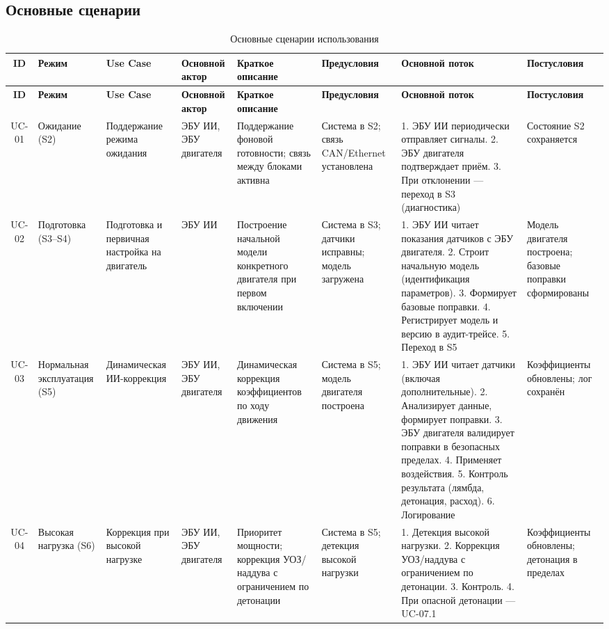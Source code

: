 \documentclass[14pt, a4paper]{extarticle}
\begin{document}
				\subsection{Основные сценарии}
					{\fontsize{9}{11}\selectfont
						\begin{xltabular}{\textwidth}{|c|L|L|L|L|L|L|L|}
						\caption{Основные сценарии использования}\label{tab:usecases-main}\\
						\hline
						\textbf{ID} & \textbf{Режим} & \textbf{Use Case} & \textbf{Основной актор} & \textbf{Краткое описание} & \textbf{Предусловия} & \textbf{Основной поток} & \textbf{Постусловия} \\
						\hline
						\endfirsthead
						\hline
						\textbf{ID} & \textbf{Режим} & \textbf{Use Case} & \textbf{Основной актор} & \textbf{Краткое описание} & \textbf{Предусловия} & \textbf{Основной поток} & \textbf{Постусловия} \\
						\hline
						\endhead
						\hline
						\endfoot
						\hline
						\endlastfoot
						UC-01 & Ожидание (S2) & Поддержание режима ожидания & ЭБУ ИИ, ЭБУ двигателя & Поддержание фоновой готовности; связь между блоками активна & Система в S2; связь CAN/Ethernet установлена & 1. ЭБУ ИИ периодически отправляет сигналы. 2. ЭБУ двигателя подтверждает приём. 3. При отклонении — переход в S3 (диагностика) & Состояние S2 сохраняется \\
						\hline
						UC-02 & Подготовка (S3–S4) & Подготовка и первичная настройка на двигатель & ЭБУ ИИ & Построение начальной модели конкретного двигателя при первом включении & Система в S3; датчики исправны; модель загружена & 1. ЭБУ ИИ читает показания датчиков с ЭБУ двигателя. 2. Строит начальную модель (идентификация параметров). 3. Формирует базовые поправки. 4. Регистрирует модель и версию в аудит-трейсе. 5. Переход в S5 & Модель двигателя построена; базовые поправки сформированы \\
						\hline
						UC-03 & Нормальная эксплуатация (S5) & Динамическая ИИ-коррекция & ЭБУ ИИ, ЭБУ двигателя & Динамическая коррекция коэффициентов по ходу движения & Система в S5; модель двигателя построена & 1. ЭБУ ИИ читает датчики (включая дополнительные). 2. Анализирует данные, формирует поправки. 3. ЭБУ двигателя валидирует поправки в безопасных пределах. 4. Применяет воздействия. 5. Контроль результата (лямбда, детонация, расход). 6. Логирование & Коэффициенты обновлены; лог сохранён \\
						\hline
						UC-04 & Высокая нагрузка (S6) & Коррекция при высокой нагрузке & ЭБУ ИИ, ЭБУ двигателя & Приоритет мощности; коррекция УОЗ/наддува с ограничением по детонации & Система в S5; детекция высокой нагрузки & 1. Детекция высокой нагрузки. 2. Коррекция УОЗ/наддува с ограничением по детонации. 3. Контроль. 4. При опасной детонации — UC-07.1 & Коэффициенты обновлены; детонация в пределах \\

\end{xltabular}}
\end{document}
